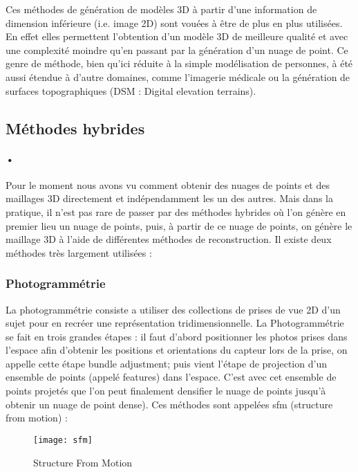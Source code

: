 Ces méthodes de génération de modèles 3D à partir d'une information de dimension inférieure (i.e. image 2D) sont vouées à être de plus en plus utilisées. En effet elles permettent l'obtention d'un modèle 3D de meilleure qualité et avec une complexité moindre qu'en passant par la génération d'un nuage de point. Ce genre de méthode, bien qu'ici réduite à la simple modélisation de personnes, à été aussi étendue à d'autre domaines, comme l'imagerie médicale ou la génération de surfaces topographiques (DSM : Digital elevation terrains)\cite{DSM}.


\subsection{Méthodes hybrides}

\paragraph{•} Pour le moment nous avons vu comment obtenir des nuages de points et des maillages 3D directement et indépendamment les un des autres. Mais dans la pratique, il n'est pas rare de passer par des méthodes hybrides où l'on génère en premier lieu un nuage de points, puis, à partir de ce nuage de points, on génère le maillage 3D à l'aide de différentes méthodes de reconstruction. Il existe deux méthodes très largement utilisées :

\subsubsection{Photogrammétrie} La photogrammétrie  consiste a utiliser des collections de prises de vue 2D d'un sujet pour en recréer une représentation tridimensionnelle. La Photogrammétrie se fait en trois grandes étapes : il faut d'abord positionner les photos prises dans l'espace afin d'obtenir les positions et orientations du capteur lors de la prise, on appelle cette étape bundle adjustment; puis vient l'étape de projection d'un ensemble de points (appelé features) dans l'espace. C'est avec cet ensemble de points projetés que l'on peut finalement densifier le nuage de points jusqu'à obtenir un nuage de point dense). Ces méthodes sont appelées sfm (structure from motion) \cite{orb} \cite{mvg} :

\begin{figure}[h]
    \centering
    \texttt{[image: sfm]}
    \caption{Structure From Motion}
    \label{fig:sfm}
\end{figure}
\FloatBarrier

